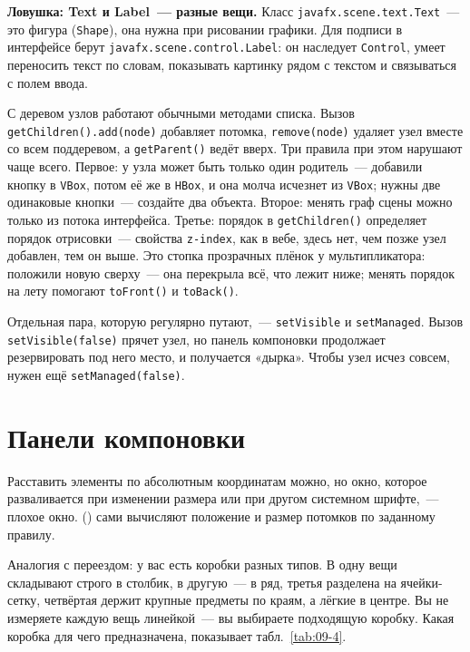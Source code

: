 \begin{oshibka}
\textbf{Ловушка: Text и Label~--- разные вещи.} Класс
\texttt{javafx.scene.text.Text}~--- это фигура (\texttt{Shape}), она нужна при
рисовании графики. Для подписи в интерфейсе берут
\texttt{javafx.scene.control.Label}: он наследует \texttt{Control}, умеет
переносить текст по словам, показывать картинку рядом с текстом и связываться с
полем ввода.
\end{oshibka}

С деревом узлов работают обычными методами списка. Вызов
\texttt{getChildren().add(node)} добавляет потомка, \texttt{remove(node)}
удаляет узел вместе со всем поддеревом, а \texttt{getParent()} ведёт вверх. Три правила при этом нарушают чаще всего. Первое: у узла может быть
только один родитель~--- добавили кнопку в \texttt{VBox}, потом её же в
\texttt{HBox}, и она молча исчезнет из \texttt{VBox}; нужны две одинаковые
кнопки~--- создайте два объекта. Второе: менять граф сцены можно только из
потока интерфейса. Третье: порядок в \texttt{getChildren()} определяет порядок
отрисовки~--- свойства \texttt{z-index}, как в вебе, здесь нет, чем позже узел
добавлен, тем он выше. Это стопка прозрачных плёнок у мультипликатора: положили
новую сверху~--- она перекрыла всё, что лежит ниже; менять порядок на лету
помогают \texttt{toFront()} и \texttt{toBack()}.

Отдельная пара, которую регулярно путают,~--- \texttt{setVisible} и
\texttt{setManaged}. Вызов \texttt{setVisible(false)} прячет узел, но панель
компоновки продолжает резервировать под него место, и получается «дырка». Чтобы
узел исчез совсем, нужен ещё \texttt{setManaged(false)}.

\section{Панели компоновки}

Расставить элементы по абсолютным координатам можно, но окно, которое
разваливается при изменении размера или при другом системном шрифте,~--- плохое
окно.  () сами вычисляют положение и
размер потомков по заданному правилу.

Аналогия с переездом: у вас есть коробки разных типов. В одну вещи складывают
строго в столбик, в другую~--- в ряд, третья разделена на ячейки-сетку,
четвёртая держит крупные предметы по краям, а лёгкие в центре. Вы не измеряете
каждую вещь линейкой~--- вы выбираете подходящую коробку. Какая коробка для чего
предназначена, показывает табл.~\ref{tab:09-4}.

